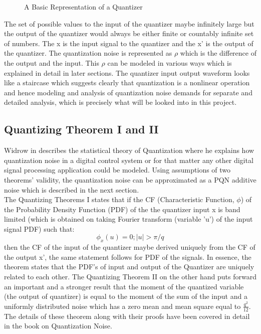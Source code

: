\documentclass[colorlinks=true,pdfstartview=FitV,linkcolor=blue,
            citecolor=red,urlcolor=magenta]{ligodoc}
\begin{document}
\begin{figure}[htbp]
 
  \centering
  
  \caption{A Basic Representation of a Quantizer}
 
\end{figure}

The set of possible values to the input of the quantizer maybe infinitely large but the output of the quantizer would always be either finite or countably infinite set of numbers. 
The x is the input signal to the quantizer and the x' is the output of the quantizer. The quantization noise is represented as $\rho$ which is the difference of the output and the input. This $\rho$ can be modeled in various ways which is explained in detail in later sections. The quantizer input output waveform looks like a staircase which suggests clearly that quantization is a nonlinear operation and hence modeling and analysis of quantization noise demands for separate and detailed analysis, which is precisely what will be looked into in this project. 
\subsection{Quantizing Theorem I and II} Widrow in \cite{Kollar} describes the statistical theory of Quantization where he explains how quantization noise in a digital control system or for that matter any other digital signal processing application could be modeled. Using assumptions of two theorems' validity, the quantization noise can be approximated as a PQN additive noise which is described in the next section. \\ 
The Quantizing Theorems I states that if the CF (Characteristic Function, $\phi$) of the Probability Density Function (PDF) of the the quantizer input x is band limited (which is obtained on taking Fourier transform (variable 'u') of the input signal PDF) such that:
\begin{equation}
\phi_x(u) = 0 ; |u| >\pi/q  
\end{equation}
then the CF of the input of the quantizer maybe derived uniquely from the CF of the output x', the same statement follows for PDF of the signals. In essence, the theorem states that the PDF's of input and output of the Quantizer are uniquely related to each other.
The Quantizing Theorem II on the other hand puts forward an important and a stronger result that the moment of the quantized variable (the output of quantizer) is equal to the moment of the sum of the input and a uniformly distributed noise which has a zero mean and mean square equal to $\frac{q^{2}}{12}$. 
\\The details of these theorem along with their proofs have been covered in detail in \cite{Widrow} the book on Quantization Noise.
\end{document}
